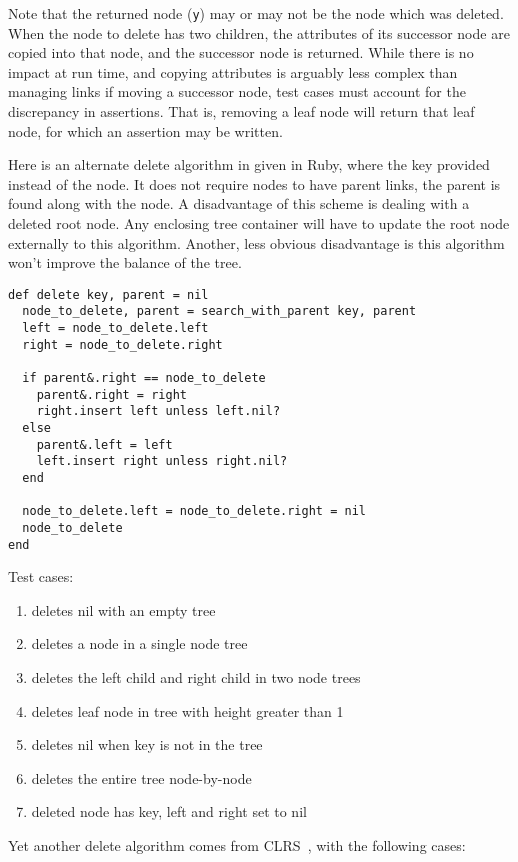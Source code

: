 \documentclass{article}
\begin{document}
Note that the returned node ({\tt y}) may or may not be the node
which was deleted. When the node to delete has two children, the
attributes of its successor node are copied into that node, and the
successor node is returned. While there is no impact at run time,
and copying attributes is arguably less complex than managing links
if moving a successor node, test cases must account for the discrepancy
in assertions. That is, removing a leaf node will return that leaf node,
for which an assertion may be written.

Here is an alternate delete algorithm in given in Ruby,
where the key provided instead of the node.
It does not require nodes to have parent links, the
parent is found along with the node. A disadvantage of
this scheme is dealing with a deleted root node. Any
enclosing tree container will have to update the
root node externally to this algorithm. Another, less
obvious disadvantage is this algorithm won't improve
the balance of the tree.

\begin{lstlisting}[frame=single]
def delete key, parent = nil
  node_to_delete, parent = search_with_parent key, parent
  left = node_to_delete.left
  right = node_to_delete.right

  if parent&.right == node_to_delete
    parent&.right = right
    right.insert left unless left.nil?
  else
    parent&.left = left
    left.insert right unless right.nil?
  end

  node_to_delete.left = node_to_delete.right = nil
  node_to_delete
end
\end{lstlisting}



Test cases:
\begin{enumerate}
\item deletes nil with an empty tree
\item deletes a node in a single node tree
\item deletes the left child and right child in two node trees
\item deletes leaf node in tree with height greater than 1
\item deletes nil when key is not in the tree
\item deletes the entire tree node-by-node
\item deleted node has key, left and right set to nil
\end{enumerate}

Yet another delete algorithm comes from CLRS~\cite{clrs}, with the following
cases:
\end{document}
